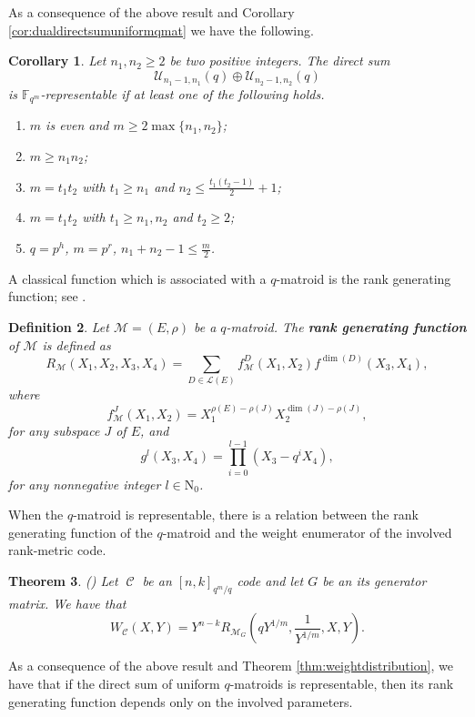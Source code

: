 \documentclass[11pt]{amsart}
\DeclareMathOperator{\C}{\mathcal{C}}
\newtheorem{theorem}{Theorem}[section]
\newtheorem{corollary}[theorem]{Corollary}
\newtheorem{definition}[theorem]{Definition}
\newcommand{\mU}{\mathcal{U}}
\newcommand{\N}{\mathrm{N}}
\newcommand{\Fm}{\mathbb{F}_{q^m}}
\begin{document}
As a consequence of the above result and Corollary \ref{cor:dualdirectsumuniformqmat} we have the following.

\begin{corollary}
    Let $n_1,n_2\geq 2$ be two positive integers. The direct sum
    $$\mU_{n_1-1,n_1}(q)\oplus \mU_{n_2-1,n_2}(q)$$
    is $\Fm$-representable if at least one of the following holds.
    \begin{enumerate}
       \item $m$ is even and $m\geq 2\max\{n_1,n_2\}$;  
       \item $m\geq n_1n_2$;
       \item $m=t_1t_2$ with $t_1\ge n_1$ and $n_2\le \frac{t_1(t_2-1)}{2}+1$; 
       \item $m=t_1t_2$ with $t_1\geq n_1,n_2$ and $t_2\geq 2$; 
       \item $q=p^h$, $m=p^r$, $n_1+n_2-1\le \frac{m}{2}$.
    \end{enumerate}
\end{corollary}

A classical function which is associated with a $q$-matroid is the rank generating function; see \cite{shiromoto2019codes}.

\begin{definition}
    Let $\mathcal{M}=(E,\rho)$ be a $q$-matroid. 
    The \textbf{rank generating function} of $\mathcal{M}$ is defined as
    \[ R_{\mathcal{M}}(X_1,X_2,X_3,X_4)=\sum_{D \in \mathcal{L}(E)} f_\mathcal{M}^D(X_1,X_2)f^{\dim(D)}(X_3,X_4), \]
    where  
    \[f_\mathcal{M}^J(X_1,X_2)=X_1^{\rho(E)-\rho(J)}X_2^{\dim(J)-\rho(J)},\]
    for any subspace $J$ of $E$, and
    \[ g^l(X_3,X_4)=\prod_{i=0}^{l-1} (X_3-q^iX_4), \]
    for any nonnegative integer $l \in \N_0$.
\end{definition}

When the $q$-matroid is representable, there is a relation between the rank generating function of the $q$-matroid and the weight enumerator of the involved rank-metric code.

\begin{theorem}(\cite[Theorem 14]{shiromoto2019codes})
    Let $\C$ be an $[n,k]_{q^m/q}$ code and let $G$ be an its generator matrix.
    We have that
    \[ W_{\C}(X,Y)=Y^{n-k}R_{\mathcal{M}_G}\left(qY^{1/m},\frac{1}{Y^{1/m}},X,Y \right). \]
\end{theorem}

As a consequence of the above result and Theorem \ref{thm:weightdistribution}, we have that if the direct sum of uniform $q$-matroids is representable, then its rank generating function depends only on the involved parameters.
\end{document}
